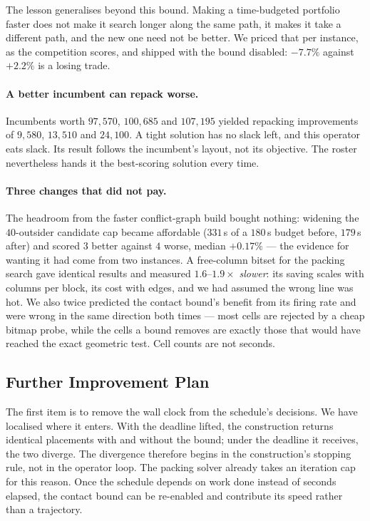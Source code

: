 \documentclass[runningheads]{llncs}
\begin{document}
The lesson generalises beyond this bound. Making a time-budgeted portfolio faster does not make it
search longer along the same path, it makes it take a different path, and the new one need not be
better. We priced that per instance, as the competition scores, and shipped with the bound
disabled: $-7.7\%$ against $+2.2\%$ is a losing trade.

\paragraph{A better incumbent can repack worse.}
Incumbents worth $97{,}570$, $100{,}685$ and $107{,}195$ yielded repacking improvements of
$9{,}580$, $13{,}510$ and $24{,}100$. A tight solution has no slack left, and this operator eats
slack. Its result follows the incumbent's layout, not its objective. The roster nevertheless hands
it the best-scoring solution every time.

\paragraph{Three changes that did not pay.}
The headroom from the faster conflict-graph build bought nothing: widening the $40$-outsider
candidate cap became affordable ($331$\,s of a $180$\,s budget before, $179$\,s after) and scored
$3$ better against $4$ worse, median $+0.17\%$ --- the evidence for wanting it had come from two
instances.
A free-column bitset for the packing search gave identical results and measured
$1.6$--$1.9\times$ \emph{slower}: its saving scales with columns per block, its cost with edges, and
we had assumed the wrong line was hot. We also twice predicted the contact bound's benefit from its
firing rate and were wrong in the same direction both times --- most cells are rejected by a cheap
bitmap probe, while the cells a bound removes are exactly those that would have reached the exact
geometric test. Cell counts are not seconds.

\subsection{Further Improvement Plan}
\label{sec:plan}

The first item is to remove the wall clock from the schedule's decisions. We have localised where
it enters. With the deadline lifted, the construction returns identical placements with and without
the bound; under the deadline it receives, the two diverge. The divergence therefore begins in the
construction's stopping rule, not in the operator loop. The packing solver already takes an
iteration cap for this reason. Once the schedule depends on work done instead of seconds elapsed,
the contact bound can be re-enabled and contribute its speed rather than a trajectory.
\end{document}
